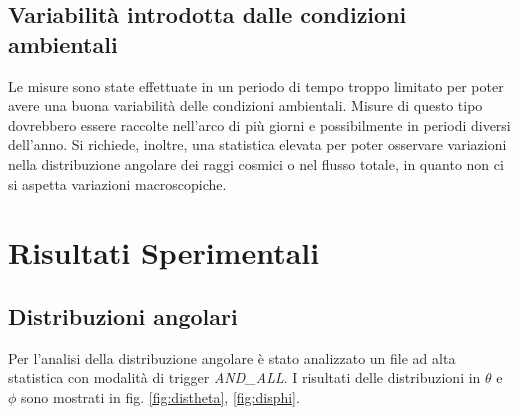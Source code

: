 \documentclass[8pt]{extarticle}
\begin{document}
\subsection{Variabilità introdotta dalle condizioni ambientali}
Le misure sono state effettuate in un periodo di tempo troppo limitato per poter avere una buona variabilità delle condizioni ambientali. Misure di questo tipo dovrebbero essere raccolte nell'arco di più giorni e possibilmente in periodi diversi dell'anno. Si richiede, inoltre, una statistica elevata per poter osservare variazioni nella distribuzione angolare dei raggi cosmici o nel flusso totale, in quanto non ci si aspetta variazioni macroscopiche.


\section{Risultati Sperimentali}
\subsection{Distribuzioni angolari}
Per l'analisi della distribuzione angolare è stato analizzato un file ad alta statistica con modalità di trigger \textit{AND\_ALL}. I risultati delle distribuzioni in $\theta$ e $\phi$ sono mostrati in fig. \ref{fig:distheta}, \ref{fig:disphi}. \\
\end{document}

